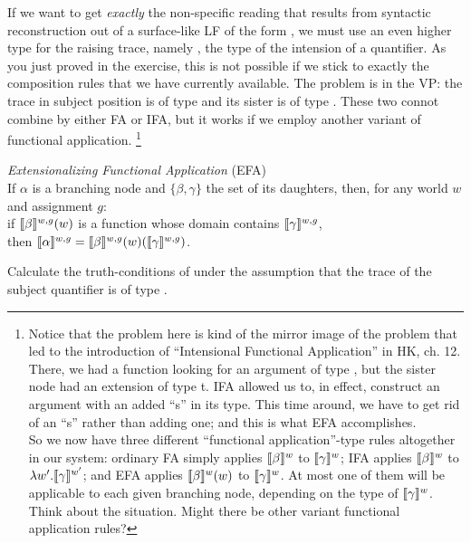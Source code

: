 If we want to get \emph{exactly} the non-specific reading that results from
syntactic reconstruction out of a surface-like LF of the form , we
must use an even higher type for the raising trace, namely
, the type of the intension of a quantifier.
As you just proved in the exercise, this is not possible if we stick to exactly
the composition rules that we have currently available. The problem is in the
VP: the trace in subject position is of type 
and its sister is of type . These two connot combine by either FA or
IFA, but it works if we employ another variant of functional application.%
\footnote{Notice that the problem here is kind of the mirror image of the problem that led to the introduction of ``Intensional Functional Application'' in H\amp K, ch. 12. There, we had a function looking for an argument of type , but the sister node had an extension of type t. IFA allowed us to, in effect, construct an argument with an added ``s'' in its type. This time around, we have to get rid of an ``s'' rather than adding one; and this is what EFA accomplishes. \\
  \indent So we now have three different ``functional application''-type rules altogether in our system: ordinary FA simply applies $\llbracket \beta \rrbracket^w$ to $\llbracket \gamma \rrbracket^w$; IFA applies $\llbracket \beta \rrbracket^w$ to $\lambda w'.\llbracket \gamma \rrbracket^{w'}$; and EFA applies $\llbracket \beta \rrbracket^w(w)$ to $\llbracket \gamma \rrbracket^w$. At most one of them will be applicable to each given branching node, depending on the type of $\llbracket \gamma \rrbracket^w$.\\
  \indent Think about the situation. Might there be other variant functional
  application rules?}

\ex \emph{Extensionalizing Functional Application} (EFA)\\
If $\alpha$ is a branching node and $\{\beta,\gamma\}$ the set of its daughters, then, for any world $w$ and assignment $g$: \\
if $\llbracket \beta \rrbracket^{w,g}(w)$ is a function whose domain contains $\llbracket \gamma \rrbracket^{w,g}$,\\
then $\llbracket \alpha \rrbracket^{w,g} = \llbracket \beta \rrbracket^{w,g}(w)(\llbracket \gamma \rrbracket^{w,g})$. \xe

\begin{exercise}
	
	Calculate the truth-conditions of  under the assumption that the
  trace of the subject quantifier is of type .
  \eex
\end{exercise}

